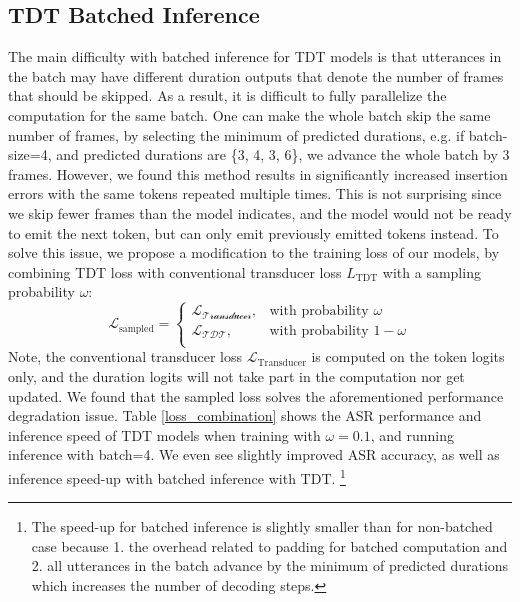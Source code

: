 \documentclass{article}
\begin{document}
\subsection{TDT Batched Inference}\label{batch}
The main difficulty with batched inference for TDT models is that utterances in the batch may have different duration outputs that denote the number of frames that should be skipped. As a result, it is difficult to fully parallelize the computation for the same batch. One can make the whole batch skip the same number of frames, by selecting the minimum of predicted  durations, e.g. if batch-size=4, and predicted durations are \{3, 4, 3, 6\}, we advance the whole batch by 3 frames. However,  we found this method  results in significantly increased insertion errors with  the same tokens repeated multiple times. This is not surprising since we skip fewer frames than the model indicates, and the model would not be ready to emit the next token, but can only emit previously emitted tokens instead. 
To solve this issue, we propose a modification to the training loss of our models, by combining TDT loss with conventional transducer loss $L_\text{TDT}$ with a sampling probability $\omega$:
\begin{equation}
    \mathcal{L}_\text{sampled} = \begin{cases}
        \mathcal{L_\text{Transducer}}, & \text{with probability } \omega \\
        \mathcal{L_\text{TDT}}, & \text{with probability } 1 - \omega \\
    \end{cases}
\end{equation}
Note, the conventional transducer loss $\mathcal{L}_\text{Transducer}$ is  computed on the token logits only, and the duration logits will not take part in the computation nor get updated.
We found that the sampled loss  solves the aforementioned performance degradation issue. Table \ref{loss_combination} shows the ASR performance and inference speed of TDT models when training with $\omega = 0.1$, and running inference with batch=4. We even see slightly improved ASR accuracy, as well as inference speed-up with batched inference with TDT. \footnote{The speed-up for batched inference is slightly smaller than for non-batched case because 1. the overhead related to padding for batched computation and 2. all utterances in the batch advance by the minimum of predicted durations which increases the number of decoding steps.}
\end{document}
